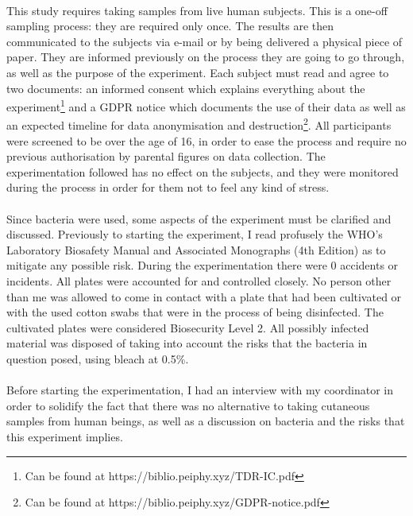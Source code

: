 \documentclass[fontsize=12pt,twoside=semi,openright,numbers=noenddot,parskip=half]{scrbook}
\begin{document}
\paragraph{}This study requires taking samples from live human subjects. This is a one-off sampling process: they are required only once. The results are then communicated to the subjects via e-mail or by being delivered a physical piece of paper. They are informed previously on the process they are going to go through, as well as the purpose of the experiment. Each subject must read and agree to two documents: an informed consent which explains everything about the experiment\footnote{Can be found at https://biblio.peiphy.xyz/TDR-IC.pdf} and a GDPR notice which documents the use of their data as well as an expected timeline for data anonymisation and destruction\footnote{Can be found at https://biblio.peiphy.xyz/GDPR-notice.pdf}. All participants were screened to be over the age of 16, in order to ease the process and require no previous authorisation by parental figures on data collection. The experimentation followed has no effect on the subjects, and they were monitored during the process in order for them not to feel any kind of stress.
\paragraph{}Since bacteria were used, some aspects of the experiment must be clarified and discussed. Previously to starting the experiment, I read profusely the WHO's Laboratory Biosafety Manual and Associated Monographs (4th Edition) as to mitigate any possible risk. During the experimentation there were 0 accidents or incidents. All plates were accounted for and controlled closely. No person other than me was allowed to come in contact with a plate that had been cultivated or with the used cotton swabs that were in the process of being disinfected. The cultivated plates were considered Biosecurity Level 2. All possibly infected material was disposed of taking into account the risks that the bacteria in question posed, using bleach at 0.5\%.
\paragraph{}Before starting the experimentation, I had an interview with my coordinator in order to solidify the fact that there was no alternative to taking cutaneous samples from human beings, as well as a discussion on bacteria and the risks that this experiment implies.
\end{document}

